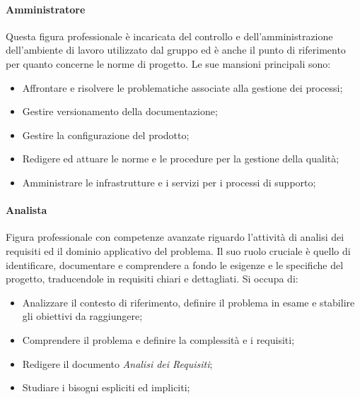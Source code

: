 \documentclass{article}
\begin{document}
        \paragraph{Amministratore}\label{amministratore}Questa figura professionale è incaricata del controllo e dell'amministrazione dell'ambiente di lavoro utilizzato dal gruppo ed è anche il punto di riferimento per quanto concerne le norme di progetto. Le sue mansioni principali sono:
        \begin{itemize}
            \item Affrontare e risolvere le problematiche associate alla gestione dei processi;
            \item Gestire versionamento della documentazione;
            \item Gestire la configurazione del prodotto;
            \item Redigere ed attuare le norme e le procedure per la gestione della qualità;
            \item Amministrare le infrastrutture e i servizi per i processi di supporto;
        \end{itemize}
        \paragraph{Analista}\label{analista}Figura professionale con competenze avanzate riguardo l'attività di analisi dei requisiti ed il dominio applicativo del problema. Il suo ruolo cruciale è quello di identificare, documentare e comprendere a fondo le esigenze e le specifiche del progetto, traducendole in requisiti chiari e dettagliati. Si occupa di:
        \begin{itemize}
            \item Analizzare il contesto di riferimento, definire il problema in esame e stabilire gli obiettivi da raggiungere;
            \item Comprendere il problema e definire la complessità e i requisiti;
            \item Redigere il documento \textit{Analisi dei Requisiti};
            \item Studiare i bisogni espliciti ed impliciti;
        \end{itemize} 
\end{document}
